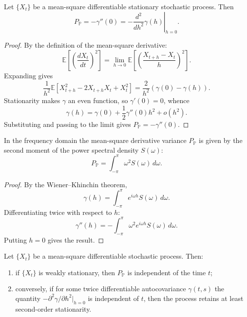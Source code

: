 \begin{proposition}\label{prop:momentum_autocorrelation}
Let $\{X_t\}$ be a mean-square differentiable stationary stochastic process. Then
\[
P_{\mathbb P}=-\gamma''(0)=-\left.\frac{d^2}{dh^2}\gamma(h)\right|_{h=0}.
\]
\end{proposition}

\begin{proof}
By the definition of the mean-square derivative:
\[
\mathbb E\left[\left(\frac{dX_t}{dt}\right)^2\right]
=\lim_{h\to0}\mathbb E\left[\left(\frac{X_{t+h}-X_t}{h}\right)^2\right].
\]
Expanding gives
\[
\frac1{h^2}\mathbb E[X_{t+h}^2-2X_{t+h}X_t+X_t^2]
=\frac{2}{h^2}(\gamma(0)-\gamma(h)).
\]
Stationarity makes $\gamma$ an even function, so $\gamma'(0)=0$, whence
\[
\gamma(h)=\gamma(0)+\frac12\gamma''(0)h^2+o(h^2).
\]
Substituting and passing to the limit gives $P_{\mathbb P}=-\gamma''(0)$.
\end{proof}

\begin{proposition}\label{prop:momentum_frequency}
In the frequency domain the mean-square derivative variance $P_{\mathbb P}$ is given by the second moment of the power spectral density $S(\omega)$:
\[
P_{\mathbb P}=\int_{-\pi}^{\pi}\omega^2S(\omega)\,d\omega.
\]
\end{proposition}

\begin{proof}
By the Wiener--Khinchin theorem,
\[
\gamma(h)=\int_{-\pi}^{\pi}e^{i\omega h}S(\omega)\,d\omega.
\]
Differentiating twice with respect to $h$:
\[
\gamma''(h)=-\int_{-\pi}^{\pi}\omega^2e^{i\omega h}S(\omega)\,d\omega.
\]
Putting $h=0$ gives the result.
\end{proof}

\begin{proposition}\label{prop:momentum_conservation_stationarity}
Let $\{X_t\}$ be a mean-square differentiable stochastic process. Then:
\begin{enumerate}[label=(\roman*)]
    \item if $\{X_t\}$ is weakly stationary, then $P_{\mathbb P}$ is independent of the time $t$;
    \item conversely, if for some twice differentiable autocovariance $\gamma(t,s)$ the quantity $-\partial^2\gamma/\partial h^2|_{h=0}$ is independent of $t$, then the process retains at least second-order stationarity.
\end{enumerate}
\end{proposition}

